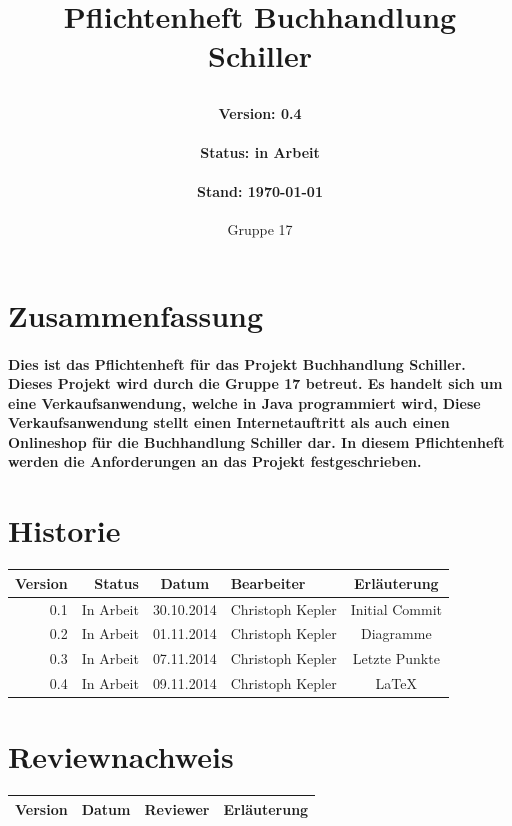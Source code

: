 \documentclass[a4paper]{article}
\author{Gruppe 17}
\title{
	\normalfont
	\normalsize 
	\huge{Pflichtenheft Buchhandlung Schiller}
	\horrule{0.5pt}
	\paragraph{Version: 0.4}
	\paragraph{Status: in Arbeit}
	\paragraph{Stand: \today}
	\horrule{2pt}
}
\begin{document}
\maketitle

\newpage
 
\section*{Zusammenfassung}

\paragraph{Dies ist das Pflichtenheft für das Projekt Buchhandlung Schiller. Dieses Projekt wird durch die Gruppe 17 betreut. Es handelt sich um eine Verkaufsanwendung, welche in Java programmiert wird, Diese Verkaufsanwendung stellt einen Internetauftritt als auch einen Onlineshop für die Buchhandlung Schiller dar. In diesem Pflichtenheft werden die Anforderungen an das Projekt festgeschrieben.}
 
\section*{Historie}

\begin{tabular}{|r|r|c|l|c|}
	\hline
	\rowcolor[HTML]{C0C0C0} 
	Version & Status    & Datum      & Bearbeiter       & Erläuterung    	\\ \hline
	0.1     & In Arbeit & 30.10.2014 & Christoph Kepler & Initial Commit 	\\ \hline
	0.2     & In Arbeit & 01.11.2014 & Christoph Kepler & Diagramme      	\\ \hline
	0.3     & In Arbeit & 07.11.2014 & Christoph Kepler & Letzte Punkte  	\\ \hline
	0.4		& In Arbeit & 09.11.2014 & Christoph Kepler	& \LaTeX			\\ \hline
\end{tabular}

\section*{Reviewnachweis}

\begin{tabular}{|l|l|l|l|}
	\hline
	\rowcolor[HTML]{C0C0C0} 
	Version & Datum      & Reviewer       & Erläuterung    \\ \hline
\end{tabular}
\end{document}
